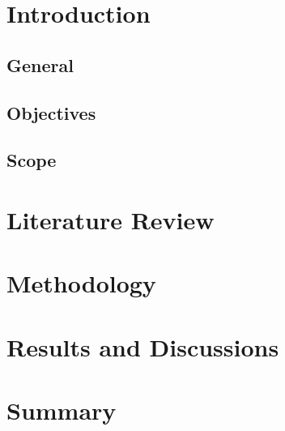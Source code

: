 \documentclass{report}
\begin{document}
	
	\chapter{Introduction}
	
		\section{General}
	
		\section{Objectives}
	
		\section{Scope}
	
	\chapter{Literature Review}
	
	\chapter{Methodology}
	
	\chapter{Results and Discussions}
	
	\chapter{Summary}
\end{document}
